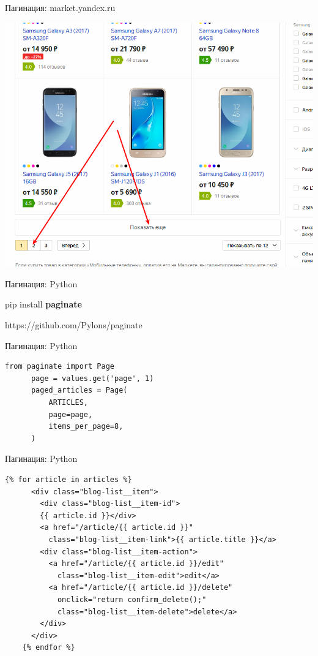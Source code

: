 \begin{frame}{Пагинация: market.yandex.ru}

  \begin{center}
    \includegraphics[width=\textwidth]{media/yandex-market-pagination.png}
  \end{center}

\end{frame}

\begin{frame}{Пагинация: Python}

  pip install \textbf{paginate}
  
  https://github.com/Pylons/paginate

\end{frame}

\begin{frame}[fragile]{Пагинация: Python}

  \begin{lstlisting}[style=python]
      from paginate import Page
      page = values.get('page', 1)
      paged_articles = Page(
          ARTICLES,
          page=page,
          items_per_page=8,
      )
  \end{lstlisting}

\end{frame}

\begin{frame}[fragile]{Пагинация: Python}

  \begin{lstlisting}[style=python]
    {% for article in articles %}
      <div class="blog-list__item">
        <div class="blog-list__item-id">
        {{ article.id }}</div>
        <a href="/article/{{ article.id }}"
          class="blog-list__item-link">{{ article.title }}</a>
        <div class="blog-list__item-action">
          <a href="/article/{{ article.id }}/edit"
            class="blog-list__item-edit">edit</a>
          <a href="/article/{{ article.id }}/delete"
            onclick="return confirm_delete();"
            class="blog-list__item-delete">delete</a>
        </div>
      </div>
    {% endfor %}
  \end{lstlisting}

\end{frame}

